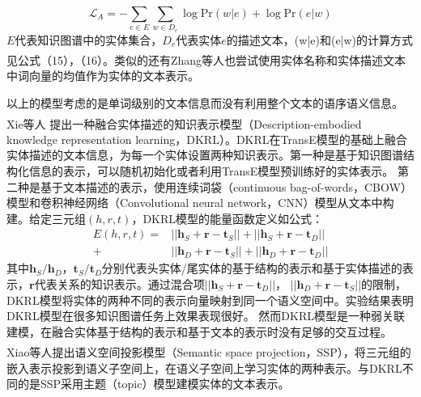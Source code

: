 \documentclass[twocolumn]{article}
\newcommand{\upcite}[1]{\textsuperscript{\textsuperscript{\cite{#1}}}}
\begin{document}
	\begin{equation}
		\mathcal{L}_A=-\sum_{e\in E}\sum_{w\in D_e}\log \text{Pr}(w|e)+\log \text{Pr}(e|w)
	\end{equation}
	$E$代表知识图谱中的实体集合，$D_e$代表实体$e$的描述文本，(w|e)和(e|w)的计算方式见公式（15），（16）。类似的还有Zhang等人\upcite{JointS}也尝试使用实体名称和实体描述文本中词向量的均值作为实体的文本表示。
	
	以上的模型考虑的是单词级别的文本信息而没有利用整个文本的语序语义信息。Xie等人\upcite{DKRL}
	提出一种融合实体描述的知识表示模型（Description-embodied knowledge representation learning，DKRL）。DKRL在TransE模型的基础上融合实体描述的文本信息，为每一个实体设置两种知识表示。第一种是基于知识图谱结构化信息的表示，可以随机初始化或者利用TransE模型预训练好的实体表示。
	第二种是基于文本描述的表示，使用连续词袋（continuous bag-of-words，CBOW）模型和卷积神经网络（Convolutional neural network，CNN）模型从文本中构建。给定三元组$(h,r,t)$，DKRL模型的能量函数定义如公式：
	\begin{equation}
		\begin{split}
			E(h,r,t)=&||\textbf{h}_S+\textbf{r}-\textbf{t}_S||+||\textbf{h}_S+\textbf{r}-\textbf{t}_D|| \\ 
			+&||\textbf{h}_D+\textbf{r}-\textbf{t}_S||+||\textbf{h}_D+\textbf{r}-\textbf{t}_D||
		\end{split}
	\end{equation}
	其中$\textbf{h}_S/\textbf{h}_D$，$\textbf{t}_S/\textbf{t}_D$分别代表头实体/尾实体的基于结构的表示和基于实体描述的表示，$\textbf{r}$代表关系的知识表示。通过混合项$||\textbf{h}_S+\textbf{r}-\textbf{t}_D||$，
	$||\textbf{h}_D+\textbf{r}-\textbf{t}_S||$的限制，DKRL模型将实体的两种不同的表示向量映射到同一个语义空间中。实验结果表明DKRL模型在很多知识图谱任务上效果表现很好。
	然而DKRL模型是一种弱关联建模，在融合实体基于结构的表示和基于文本的表示时没有足够的交互过程。
	Xiao等人\upcite{SSP}提出语义空间投影模型（Semantic space projection，SSP），将三元组的嵌入表示投影到语义子空间上，在语义子空间上学习实体的两种表示。与DKRL不同的是SSP采用主题（topic）模型建模实体的文本表示。
	
\end{document}
